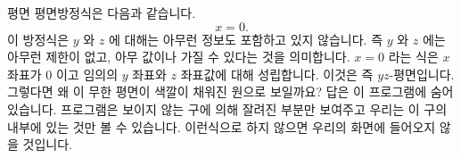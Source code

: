 \begin{surferPage}{평면}
평면방정식은 다음과 같습니다.\[x=0.\] 이 방정식은 $y$ 와 $z$ 에 대해는 아무런 정보도 포함하고 있지 않습니다. 즉 $y$ 와 $z$ 에는 아무런 제한이 없고, 아무 값이나 가질 수 있다는 것을 의미합니다.
$x=0$ 라는 식은 $x$ 좌표가 $0$ 이고 임의의 $y$ 좌표와 $z$ 좌표값에 대해 성립합니다. 이것은 즉 $yz$-평면입니다.
\newline \newline
그렇다면 왜 이 무한 평면이 색깔이 채워진 원으로 보일까요? 답은 이 프로그램에 숨어있습니다. 프로그램은 보이지 않는 구에 의해 잘려진 부분만 보여주고 우리는 이 구의 내부에 있는 것만 볼 수 있습니다. 이런식으로 하지 않으면 우리의 화면에 들어오지 않을 것입니다.
\end{surferPage}
